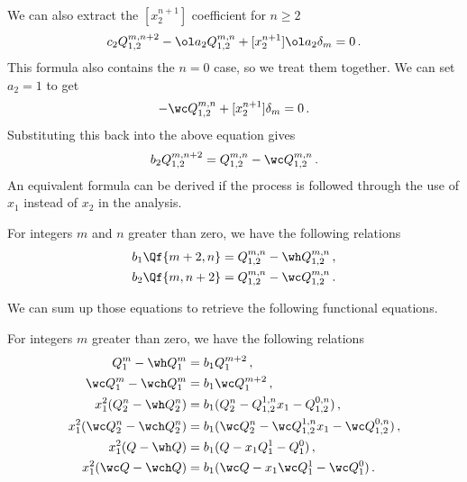 We can also extract the $[x_2^{n+1}]$ coefficient for $n\geq 2$
\begin{align}
 	c_2 Q_{1,2}^{m,n+2}- \ol a_2Q_{1,2}^{m,n}+[x_2^{n+1}] \ol a_2\delta_m= 0\,.
\end{align}
This formula also contains the $n = 0$ case, so we treat them together. We can set $a_2 = 1$ to get
\begin{align}
	-\wc Q_{1,2}^{m,n}+[x_2^{n+1}]\delta_m = 0\,.
\end{align}
Substituting this back into the above equation gives
\begin{align}
	b_2 Q_{1,2}^{m,n+2} = Q_{1,2}^{m,n} - \wc Q_{1,2}^{m,n}\,.
\end{align}
An equivalent formula can be derived if the process is followed through the use of $x_1$ instead of $x_2$ in the analysis.
\begin{corollary} For integers $m$ and $n$ greater than zero, we have the following relations
\begin{align}
	b_1 \Qf{m+2,n} &= Q_{1,2}^{m,n}-\wh Q_{1,2}^{m,n}\,,\\
	b_2 \Qf{m,n+2} &= Q_{1,2}^{m,n}-\wc Q_{1,2}^{m,n}\,.
\end{align}
\end{corollary}

We can sum up those equations to retrieve the following functional equations.
\begin{corollary} For integers $m$ greater than zero, we have the following relations
\begin{align}
	Q_1^m - \wh Q_1^m &= b_1 Q_1^{m+2}\,,\\
	\wc Q_1^m - \wch Q_1^m &= b_1 \wc Q_1^{m+2}\,,\\
	x_1^2(Q_2^n-\wh Q_2^n) &= b_1 (Q_2^n - Q_{1,2}^{1,n}x_1 - Q_{1,2}^{0,n})\,,\\
	x_1^2(\wc Q_2^n-\wch Q_2^n) &= b_1 (\wc Q_2^n - \wc Q_{1,2}^{1,n}x_1 - \wc Q_{1,2}^{0,n})\,,\\
	x_1^2(Q-\wh Q) &= b_1(Q-x_1Q_1^1-Q_1^0)\,,\\
	x_1^2(\wc Q-\wch Q) &= b_1(\wc Q-x_1\wc Q_1^1-\wc Q_1^0)\,.
\end{align}
\end{corollary}


